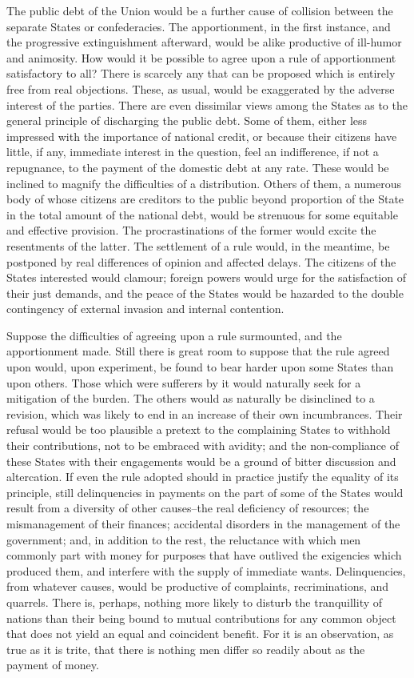 The public debt of the Union would be a further cause of collision between the separate States or confederacies. The apportionment, in the first instance, and the progressive extinguishment afterward, would be alike productive of ill-humor and animosity. How would it be possible to agree upon a rule of apportionment satisfactory to all? There is scarcely any that can be proposed which is entirely free from real objections. These, as usual, would be exaggerated by the adverse interest of the parties. There are even dissimilar views among the States as to the general principle of discharging the public debt. Some of them, either less impressed with the importance of national credit, or because their citizens have little, if any, immediate interest in the question, feel an indifference, if not a repugnance, to the payment of the domestic debt at any rate. These would be inclined to magnify the difficulties of a distribution. Others of them, a numerous body of whose citizens are creditors to the public beyond proportion of the State in the total amount of the national debt, would be strenuous for some equitable and effective provision. The procrastinations of the former would excite the resentments of the latter. The settlement of a rule would, in the meantime, be postponed by real differences of opinion and affected delays. The citizens of the States interested would clamour; foreign powers would urge for the satisfaction of their just demands, and the peace of the States would be hazarded to the double contingency of external invasion and internal contention.

Suppose the difficulties of agreeing upon a rule surmounted, and the apportionment made. Still there is great room to suppose that the rule agreed upon would, upon experiment, be found to bear harder upon some States than upon others. Those which were sufferers by it would naturally seek for a mitigation of the burden. The others would as naturally be disinclined to a revision, which was likely to end in an increase of their own incumbrances. Their refusal would be too plausible a pretext to the complaining States to withhold their contributions, not to be embraced with avidity; and the non-compliance of these States with their engagements would be a ground of bitter discussion and altercation. If even the rule adopted should in practice justify the equality of its principle, still delinquencies in payments on the part of some of the States would result from a diversity of other causes--the real deficiency of resources; the mismanagement of their finances; accidental disorders in the management of the government; and, in addition to the rest, the reluctance with which men commonly part with money for purposes that have outlived the exigencies which produced them, and interfere with the supply of immediate wants. Delinquencies, from whatever causes, would be productive of complaints, recriminations, and quarrels. There is, perhaps, nothing more likely to disturb the tranquillity of nations than their being bound to mutual contributions for any common object that does not yield an equal and coincident benefit. For it is an observation, as true as it is trite, that there is nothing men differ so readily about as the payment of money.

